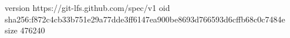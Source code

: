 version https://git-lfs.github.com/spec/v1
oid sha256:f872c4cb33b751e29a77dde3ff6147ea900be8693d766593d6cffb68c0c7484e
size 476240
